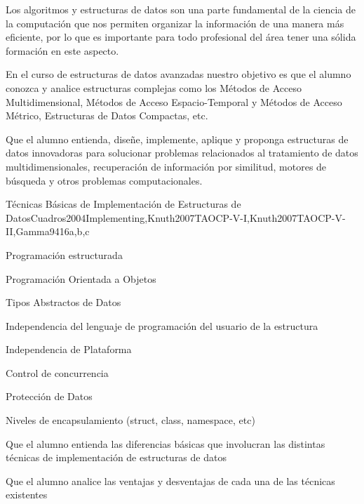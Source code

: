 \begin{syllabus}


\begin{justification}
Los algoritmos y estructuras de datos son una parte fundamental de la ciencia de la computación que nos 
permiten organizar la información de una manera más eficiente, por lo que es importante para todo 
profesional del área tener una sólida formación en este aspecto.

En el curso de estructuras de datos avanzadas nuestro objetivo es que el alumno conozca y analice 
estructuras complejas como los Métodos de Acceso Multidimensional, 
Métodos de Acceso Espacio-Temporal y 
Métodos de Acceso Métrico, Estructuras de Datos Compactas, etc.
\end{justification}

\begin{goals}
\item Que el alumno entienda, diseñe, implemente, aplique y
proponga estructuras de datos innovadoras para solucionar
problemas relacionados al tratamiento de datos multidimensionales,
recuperación de información por similitud, motores de búsqueda y
otros problemas computacionales.
\end{goals}



\begin{unit}{Técnicas Básicas de Implementación de Estructuras de Datos}{}{Cuadros2004Implementing,Knuth2007TAOCP-V-I,Knuth2007TAOCP-V-II,Gamma94}{16}{a,b,c}
   \begin{topics}
         \item Programación estructurada
         \item Programación Orientada a Objetos
         \item Tipos Abstractos de Datos
         \item Independencia del lenguaje de programación del usuario de la estructura
         \item Independencia de Plataforma
         \item Control de concurrencia
         \item Protección de Datos
         \item Niveles de encapsulamiento (struct, class, namespace, etc)
   \end{topics}

   \begin{learningoutcomes}
         \item Que el alumno entienda las diferencias básicas que involucran las distintas técnicas de implementación de estructuras de datos
         \item Que el alumno analice las ventajas y desventajas de cada una de las técnicas existentes
   \end{learningoutcomes}
\end{unit}


\end{syllabus}
